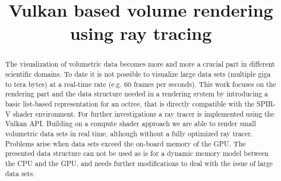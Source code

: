\documentclass[12pt,conference]{IEEEtran}
\begin{document}
\title{Vulkan based volume rendering\\using ray tracing}

\author{
}
\maketitle
\thispagestyle{plain}
\pagestyle{plain} 

\begin{abstract}
The visualization of volumetric data becomes more and more a crucial part in different scientific domains.
To date it is not possible to visualize large data sets (multiple giga to tera bytes) at a real-time rate (e.g. 60 frames per seconds).
This work focuses on the rendering part and the data structure needed in a rendering system by introducing a basic list-based representation for an octree, that is directly compatible with the SPIR-V shader environment. For further investigations a ray tracer is implemented using the Vulkan API.
Building on a compute shader approach we are able to render small volumetric data sets in real time, although without a fully optimized ray tracer. Problems arise when data sets exceed the on-board memory of the GPU.
The presented data structure can not be used as is for a dynamic memory model between the CPU and the GPU, and needs further modifications to deal with the issue of large data sets.
\end{abstract}
\end{document}
